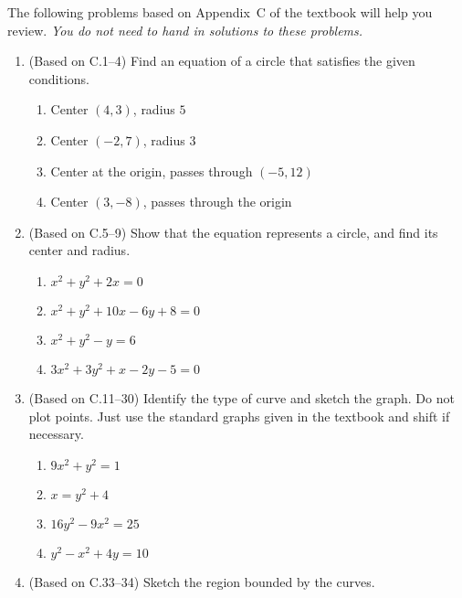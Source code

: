 \documentclass[11pt]{article}
\title{\commonPSTitleZeroZeroC}
\author{\commonAuthor}
\date{\commonDateZeroZeroC}
\newcommand{\ds}{\displaystyle}
\begin{document}
\maketitle
\thispagestyle{empty}

\noindent
The following problems based on Appendix~C of the textbook will help
you review.  \emph{You do not need to hand in solutions to these
  problems.}
\begin{enumerate}
\item (Based on C.1--4) Find an equation of a circle that satisfies the
  given conditions.
  \begin{enumerate}
  \item Center $(4,3)$, radius $5$
  \item Center $(-2,7)$, radius $3$
  \item Center at the origin, passes through $(-5,12)$
  \item Center $(3,-8)$, passes through the origin
  \end{enumerate}
\item (Based on C.5--9) Show that the equation represents a circle, and find
  its center and radius.
  \begin{multicols}{2}
  \begin{enumerate}
  \item $\ds x^2+y^2+2x=0$
  \item $\ds x^2+y^2+10x-6y+8=0$
  \item $\ds x^2+y^2-y=6$
  \item $\ds 3x^2+3y^2+x-2y-5=0$
  \end{enumerate}
  \end{multicols}
\item (Based on C.11--30) Identify the type of curve and sketch the graph.
  Do not plot points.  Just use the standard graphs given in the textbook
  and shift if necessary.
  \begin{multicols}{4}
  \begin{enumerate}
  \item $\ds 9x^2+y^2=1$
  \item $\ds x=y^2+4$
  \item $\ds 16y^2-9x^2=25$
  \item $\ds y^2-x^2+4y=10$
  \end{enumerate}
  \end{multicols}
\item (Based on C.33--34) Sketch the region bounded by the curves.
  \begin{multicols}{2}
  \begin{enumerate}

\end{enumerate}
\end{multicols}
\end{enumerate}
\end{document}
